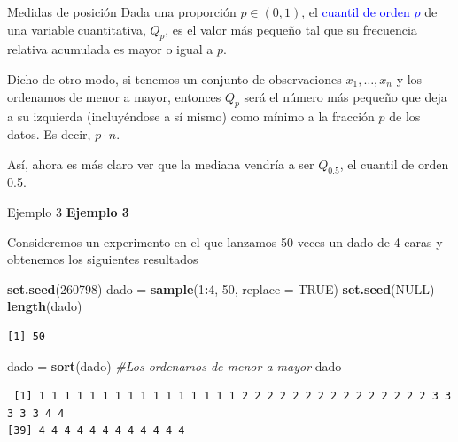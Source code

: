 \documentclass[
  ignorenonframetext,
  aspectratio=169]{beamer}
\newenvironment{Shaded}{\begin{snugshade}}{\end{snugshade}}
\newcommand{\AttributeTok}[1]{\textcolor[rgb]{0.13,0.29,0.53}{#1}}
\newcommand{\CommentTok}[1]{\textcolor[rgb]{0.56,0.35,0.01}{\textit{#1}}}
\newcommand{\ConstantTok}[1]{\textcolor[rgb]{0.56,0.35,0.01}{#1}}
\newcommand{\DecValTok}[1]{\textcolor[rgb]{0.00,0.00,0.81}{#1}}
\newcommand{\FunctionTok}[1]{\textcolor[rgb]{0.13,0.29,0.53}{\textbf{#1}}}
\newcommand{\NormalTok}[1]{#1}
\newcommand{\OtherTok}[1]{\textcolor[rgb]{0.56,0.35,0.01}{#1}}
\newcommand{\SpecialCharTok}[1]{\textcolor[rgb]{0.81,0.36,0.00}{\textbf{#1}}}
\newcommand\blue[1]{\textcolor{blue}{#1}}
\begin{document}
\begin{frame}{Medidas de posición}
\label{medidas-de-posiciuxf3n-1}
Dada una proporción \(p\in(0,1)\), el \blue{cuantil de orden $p$} de una
variable cuantitativa, \(Q_p\), es el valor más pequeño tal que su
frecuencia relativa acumulada es mayor o igual a \(p\).

Dicho de otro modo, si tenemos un conjunto de observaciones
\(x_1,\dots,x_n\) y los ordenamos de menor a mayor, entonces \(Q_p\)
será el número más pequeño que deja a su izquierda (incluyéndose a sí
mismo) como mínimo a la fracción \(p\) de los datos. Es decir,
\(p\cdot n\).

Así, ahora es más claro ver que la mediana vendría a ser \(Q_{0.5}\), el
cuantil de orden 0.5.
\end{frame}

\begin{frame}[fragile]{Ejemplo 3}
\label{ejemplo-3-5}
\textbf{Ejemplo 3}

Consideremos un experimento en el que lanzamos 50 veces un dado de 4
caras y obtenemos los siguientes resultados

\begin{Shaded}
\begin{Highlighting}[]
\FunctionTok{set.seed}\NormalTok{(}\DecValTok{260798}\NormalTok{)}
\NormalTok{dado }\OtherTok{=} \FunctionTok{sample}\NormalTok{(}\DecValTok{1}\SpecialCharTok{:}\DecValTok{4}\NormalTok{, }\DecValTok{50}\NormalTok{, }\AttributeTok{replace =} \ConstantTok{TRUE}\NormalTok{)}
\FunctionTok{set.seed}\NormalTok{(}\ConstantTok{NULL}\NormalTok{)}
\FunctionTok{length}\NormalTok{(dado)}
\end{Highlighting}
\end{Shaded}

\begin{verbatim}
[1] 50
\end{verbatim}

\begin{Shaded}
\begin{Highlighting}[]
\NormalTok{dado }\OtherTok{=} \FunctionTok{sort}\NormalTok{(dado) }\CommentTok{\#Los ordenamos de menor a mayor}
\NormalTok{dado}
\end{Highlighting}
\end{Shaded}

\begin{verbatim}
 [1] 1 1 1 1 1 1 1 1 1 1 1 1 1 1 1 1 2 2 2 2 2 2 2 2 2 2 2 2 2 2 2 3 3 3 3 3 4 4
[39] 4 4 4 4 4 4 4 4 4 4 4 4
\end{verbatim}
\end{frame}
\end{document}
